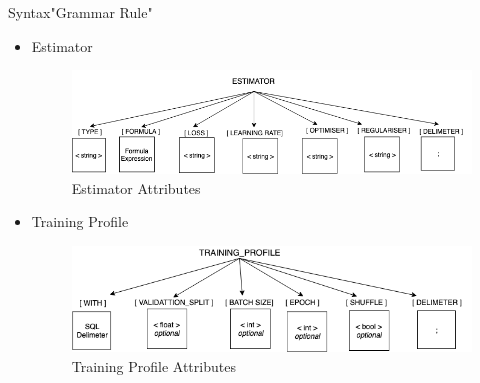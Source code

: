 \documentclass[handout, xcolor={dvipsnames}]{beamer}
\begin{document}
\begin{frame}{Syntax}{"Grammar Rule"}
  \begin{itemize}
  \item<1-> {Estimator
     \begin{figure}
         \centering
         \includegraphics[scale = 0.25]{EstimatorTree.png}
         \caption{Estimator Attributes}
         \label{fig:Est_tree}
     \end{figure}
  }
  \item<2->{Training Profile
       \begin{figure}
         \centering
         \includegraphics[scale = 0.25]{TrainProfile_Tree.png}
         \caption{Training Profile Attributes}
         \label{fig:Est_tree}
     \end{figure}
  
  }
     
  \end{itemize}
\end{frame}
\end{document}
